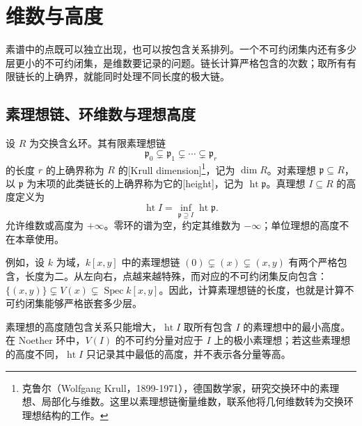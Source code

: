 
\section{维数与高度}
\label{b3:sec:0901}

素谱中的点既可以独立出现，也可以按包含关系排列。一个不可约闭集内还有多少层更小的不可约闭集，是维数要记录的问题。链长计算严格包含的次数；取所有有限链长的上确界，就能同时处理不同长度的极大链。

\subsection{素理想链、环维数与理想高度}
\label{b3:subsec:0901:01}

\begin{definition}\label{b3:def:krull-dimension-height}
	设 \(R\) 为交换含幺环。其有限素理想链
	\[
		\mathfrak p_0\subsetneq\mathfrak p_1\subsetneq\cdots\subsetneq\mathfrak p_r
	\]
	的长度 \(r\) 的上确界称为 \(R\) 的[Krull dimension]\footnote{克鲁尔（Wolfgang Krull，1899-1971），德国数学家，研究交换环中的素理想、局部化与维数。这里以素理想链衡量维数，联系他将几何维数转为交换环理想结构的工作。}，记为 \(\dim R\)。对素理想 \(\mathfrak p\subseteq R\)，以 \(\mathfrak p\) 为末项的此类链长的上确界称为它的[height]，记为 \(\operatorname{ht}\mathfrak p\)。真理想 \(I\subseteq R\) 的高度定义为
	\[
		\operatorname{ht}I=\inf_{\mathfrak p\supseteq I}\operatorname{ht}\mathfrak p.
	\]
	允许维数或高度为 \(+\infty\)。零环的谱为空，约定其维数为 \(-\infty\)；单位理想的高度不在本章使用。
\end{definition}

例如，设 \(k\) 为域，\(k[x,y]\) 中的素理想链 \((0)\subsetneq(x)\subsetneq(x,y)\) 有两个严格包含，长度为二。从左向右，点越来越特殊，而对应的不可约闭集反向包含：\(\{(x,y)\}\subsetneq V(x)\subsetneq\operatorname{Spec}k[x,y]\)。因此，计算素理想链的长度，也就是计算不可约闭集能够严格嵌套多少层。

\ProseParagraphBreak
素理想的高度随包含关系只能增大，\(\operatorname{ht}I\) 取所有包含 \(I\) 的素理想中的最小高度。在 Noether 环中，\(V(I)\) 的不可约分量对应于 \(I\) 上的极小素理想；若这些素理想的高度不同，\(\operatorname{ht}I\) 只记录其中最低的高度，并不表示各分量等高。

